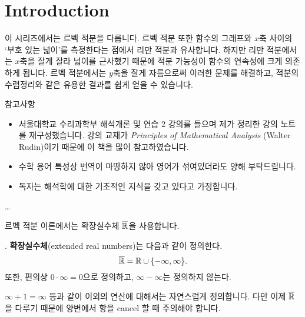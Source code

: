 \section*{Introduction}

이 시리즈에서는 르벡 적분을 다룹니다. 르벡 적분 또한 함수의 그래프와 \(x\)축 사이의 `부호 있는 넓이'를 측정한다는 점에서 리만 적분과 유사합니다. 하지만 리만 적분에서는 \(x\)축을 잘게 잘라 넓이를 근사했기 때문에 적분 가능성이 함수의 연속성에 크게 의존하게 됩니다. 르벡 적분에서는 \(y\)축을 잘게 자름으로써 이러한 문제를 해결하고, 적분의 수렴정리와 같은 유용한 결과를 쉽게 얻을 수 있습니다.

참고사항
\begin{itemize}
    \item 서울대학교 수리과학부 해석개론 및 연습 2 강의를 들으며 제가 정리한 강의 노트를 재구성했습니다. 강의 교재가 \textit{Principles of Mathematical Analysis} (Walter Rudin)이기 때문에 이 책을 많이 참고하였습니다.
    \item 수학 용어 특성상 번역이 마땅하지 않아 영어가 섞여있더라도 양해 부탁드립니다.
    \item 독자는 해석학에 대한 기초적인 지식을 갖고 있다고 가정합니다.
\end{itemize}

\dots

르벡 적분 이론에서는 확장실수체 \(\overline{\R}\)을 사용합니다.

. \note{\(\overline{\R}\)} \textbf{확장실수체}(extended real numbers)는 다음과 같이 정의한다.
\[
    \overline{\mathbb{R}} = \mathbb{R} \cup \{-\infty, \infty\}.
\]
또한, 편의상 \(0\cdot \infty = 0\)으로 정의하고, \(\infty - \infty\)는 정의하지 않는다.

\(\infty + 1 = \infty\) 등과 같이 이외의 연산에 대해서는 자연스럽게 정의합니다. 다만 이제 \(\overline{\R}\)을 다루기 때문에 양변에서 항을 cancel 할 때 주의해야 합니다.

\pagebreak

\begin{center}
    \def\setA{(-0.866, 0.5) circle (\setradius cm)}
    \def\setB{(0.866, 0.5) circle (\setradius cm)}
    \def\setC{(0, -1) circle (\setradius cm)}

\end{center}


